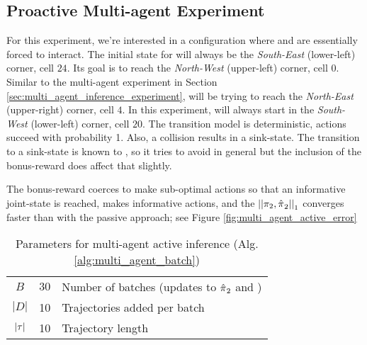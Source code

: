 \subsection{Proactive Multi-agent Experiment}

	For this experiment, we're interested in a configuration where  and  are essentially forced to interact. The initial state for  will always be the \emph{South-East} (lower-left) corner, cell $24$. Its goal is to reach the \emph{North-West} (upper-left) corner, cell $0$. Similar to the multi-agent experiment in Section \ref{sec:multi_agent_inference_experiment},  will be trying to reach the \emph{North-East} (upper-right) corner, cell $4$. In this experiment,  will always start in the \emph{South-West} (lower-left) corner, cell $20$. The transition model is deterministic, actions succeed with probability 1. Also, a collision results in a sink-state. The transition to a sink-state is known to , so it tries to avoid  in general but the inclusion of the bonus-reward does affect that slightly.
	
	The bonus-reward coerces  to make sub-optimal actions so that an informative joint-state is reached,  makes informative actions, and the $\left|\left|\pi_{2},\hat{\pi_{}}_2\right|\right|_1$ converges faster than with the passive approach; see Figure \ref{fig:multi_agent_active_error}

    \begin{table}[htb]
	\centering
	\begin{tabular}{c|l l}
		$B$ & $30$ & Number of batches (updates to $\hat{\pi_{}}_2$ and \policy{1})\\
		$|D|$ & 10 & Trajectories added per batch \\
		$|\tau|$ & 10 & Trajectory length \\
	\end{tabular}
	\caption{Parameters for multi-agent active inference (Alg. \ref{alg:multi_agent_batch})}
	\label{table:multi_agent_active_alg_params}
\end{table}


